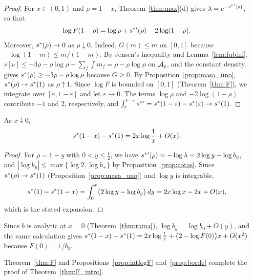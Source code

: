 \begin{proof} For $x\in(0,1)$ and $\rho=1-x$, Theorem~\ref{thm:max}(d) gives $\lambda=e^{-s^{*}{}'(\rho)}$, so that \[
 \log F(1-\rho)=\log\rho+s^{*}{}'(\rho)-2\log(1-\rho).
\] Moreover, $s^{*}(\rho)\to0$ as $\rho\downarrow0$. Indeed, $G(m)\le m$ on $[0,1]$ because $-\log(1-m)\le m/(1-m)$. By Jensen's
inequality and Lemma~\ref{lem:fubini}, $s[\nu]\le-3\rho-\rho\log\rho+\sum_f\int m_f=\rho-\rho\log\rho$ on ${\mathcal{A}}_\rho$, and the constant
density gives $s^{*}(\rho)\ge-3\rho-\rho\log\rho$ because $G\ge0$. By Proposition~\ref{prop:masa_uno}, $s^{*}(\rho)\to s^{*}(1)$ as
$\rho\uparrow1$. Since $\log F$ is bounded on $[0,1]$ (Theorem~\ref{thm:F}), we integrate over $[\varepsilon,1-\varepsilon]$ and let
$\varepsilon\to0$. The terms $\log\rho$ and $-2\log(1-\rho)$ contribute $-1$ and $2$, respectively, and
$\int_\varepsilon^{1-\varepsilon}s^{*}{}'=s^{*}(1-\varepsilon)-s^{*}(\varepsilon)\to s^{*}(1)$. \end{proof}

\begin{proposicion}\label{prop:borde} As $x\downarrow0$, \[
 s^{*}(1-x)-s^{*}(1)=2x\log\frac1x+O(x).
\] \end{proposicion}

\begin{proof} For $\rho=1-y$ with $0<y\le\frac12$, we have $s^{*}{}'(\rho)=-\log\lambda=2\log y-\log b_y$, and $|\log
b_y|\le\max\{\log2,\log b_+\}$ by Proposition~\ref{prop:cotas}. Since $s^{*}(\rho)\to s^{*}(1)$ (Proposition~\ref{prop:masa_uno}) and
$\log y$ is integrable, \[
 s^{*}(1)-s^{*}(1-x)=\int_0^x\bigl(2\log y-\log b_y\bigr)\,dy=2x\log x-2x+O(x),
\] which is the stated expansion. \end{proof}

\begin{observacion}\label{obs:borde_fino} Since $b$ is analytic at $x=0$ (Theorem~\ref{thm:rama}), $\log b_y=\log b_0+O(y)$, and the
same calculation gives $s^{*}(1-x)-s^{*}(1)=2x\log\frac1x+\bigl(2-\log F(0)\bigr)x+O(x^2)$ because $F(0)=1/b_0$. \end{observacion}

Theorem~\ref{thm:F} and Propositions~\ref{prop:intlogF} and~\ref{prop:borde} complete the proof of Theorem~\ref{thm:F_intro}.

